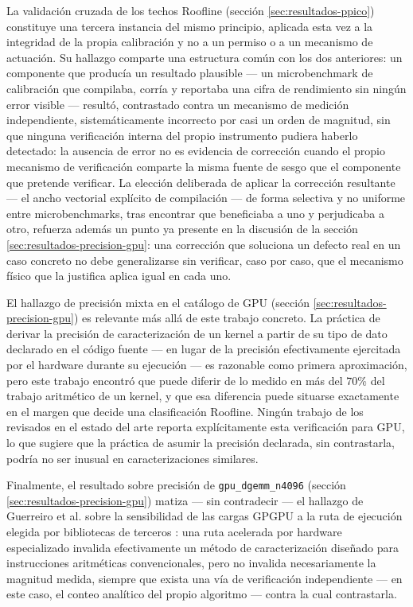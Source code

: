 \documentclass[12pt,oneside,spanish]{book}
\begin{document}
La validación cruzada de los techos Roofline (sección \ref{sec:resultados-ppico}) constituye una tercera instancia del mismo principio, aplicada esta vez a la integridad de la propia calibración y no a un permiso o a un mecanismo de actuación. Su hallazgo comparte una estructura común con los dos anteriores: un componente que producía un resultado plausible --- un microbenchmark de calibración que compilaba, corría y reportaba una cifra de rendimiento sin ningún error visible --- resultó, contrastado contra un mecanismo de medición independiente, sistemáticamente incorrecto por casi un orden de magnitud, sin que ninguna verificación interna del propio instrumento pudiera haberlo detectado: la ausencia de error no es evidencia de corrección cuando el propio mecanismo de verificación comparte la misma fuente de sesgo que el componente que pretende verificar. La elección deliberada de aplicar la corrección resultante --- el ancho vectorial explícito de compilación --- de forma selectiva y no uniforme entre microbenchmarks, tras encontrar que beneficiaba a uno y perjudicaba a otro, refuerza además un punto ya presente en la discusión de la sección \ref{sec:resultados-precision-gpu}: una corrección que soluciona un defecto real en un caso concreto no debe generalizarse sin verificar, caso por caso, que el mecanismo físico que la justifica aplica igual en cada uno.

El hallazgo de precisión mixta en el catálogo de GPU (sección \ref{sec:resultados-precision-gpu}) es relevante más allá de este trabajo concreto. La práctica de derivar la precisión de caracterización de un kernel a partir de su tipo de dato declarado en el código fuente --- en lugar de la precisión efectivamente ejercitada por el hardware durante su ejecución --- es razonable como primera aproximación, pero este trabajo encontró que puede diferir de lo medido en más del 70\% del trabajo aritmético de un kernel, y que esa diferencia puede situarse exactamente en el margen que decide una clasificación Roofline. Ningún trabajo de los revisados en el estado del arte reporta explícitamente esta verificación para GPU, lo que sugiere que la práctica de asumir la precisión declarada, sin contrastarla, podría no ser inusual en caracterizaciones similares.

Finalmente, el resultado sobre precisión de \texttt{gpu\_dgemm\_n4096} (sección \ref{sec:resultados-precision-gpu}) matiza --- sin contradecir --- el hallazgo de Guerreiro et al. sobre la sensibilidad de las cargas GPGPU a la ruta de ejecución elegida por bibliotecas de terceros \cite{Guerreiro2019}: una ruta acelerada por hardware especializado invalida efectivamente un método de caracterización diseñado para instrucciones aritméticas convencionales, pero no invalida necesariamente la magnitud medida, siempre que exista una vía de verificación independiente --- en este caso, el conteo analítico del propio algoritmo --- contra la cual contrastarla.
\end{document}

